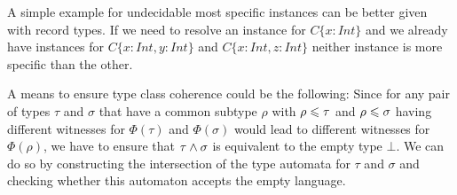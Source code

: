 A simple example for undecidable most specific instances can be better given with record types.
If we need to resolve an instance for $C \{x : Int\}$ and we already have instances for $C \{x : Int, y : Int\}$ and $C \{x : Int, z : Int\}$ neither instance is more specific than the other.


A means to ensure type class coherence could be the following:
Since for any pair of types $\tau$ and $\sigma$ that have a common subtype $\rho$ with $\rho \leqslant \tau$ and $\rho \leqslant \sigma$ having different witnesses for $\Phi(\tau)$ and $\Phi(\sigma)$ would lead to different witnesses for $\Phi(\rho)$,
we have to ensure that $\tau \wedge \sigma$ is equivalent to the empty type $\bot$.
We can do so by constructing the intersection of the type automata for $\tau$ and $\sigma$ and checking whether this automaton accepts the empty language.

